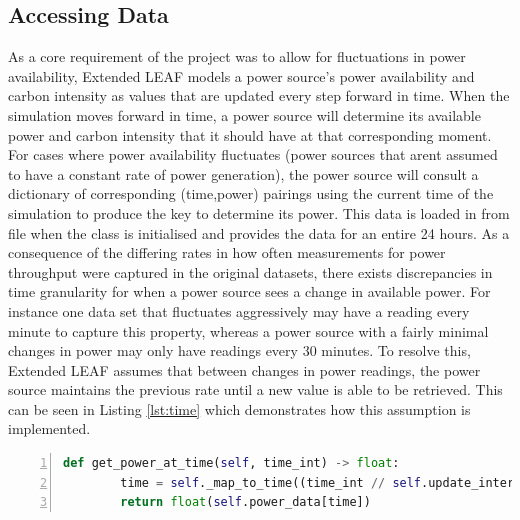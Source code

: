 \documentclass{l4proj}
\begin{document}
\subsection{Accessing Data}\label{imp:subsec:daa}

As a core requirement of the project was to allow for fluctuations in power availability, Extended LEAF models a power source's power availability and carbon intensity as values that are updated every step forward in time.
When the simulation moves forward in time, a power source will determine its available power and carbon intensity that it should have at that corresponding moment.
For cases where power availability fluctuates (power sources that arent assumed to have a constant rate of power generation), the power source will consult a dictionary of corresponding (time,power) pairings using the current time of the simulation to produce the key to determine its power.
This data is loaded in from file when the class is initialised and provides the data for an entire 24 hours.
As a consequence of the differing rates in how often measurements for power throughput were captured in the original datasets, there exists discrepancies in time granularity for when a power source sees a change in available power.
For instance one data set that fluctuates aggressively may have a reading every minute to capture this property, whereas a power source with a fairly minimal changes in power may only have readings every 30 minutes.
To resolve this, Extended LEAF assumes that between changes in power readings, the power source maintains the previous rate until a new value is able to be retrieved.
This can be seen in Listing \ref{lst:time} which demonstrates how this assumption is implemented.\\

\begin{lstlisting}[language=python, numbers=left, caption={Example use of how a power source accesses it's available power.}, label=lst:time]
    def get_power_at_time(self, time_int) -> float:
        time = self._map_to_time((time_int // self.update_interval) % len(self.power_data))
        return float(self.power_data[time])
\end{lstlisting}
\end{document}

